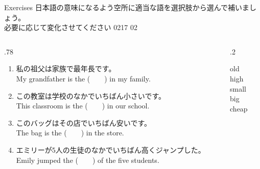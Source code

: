 \documentclass[aspectratio=169,xcolor={dvipsnames,table}]{beamer}
\begin{document}
\begin{frame}[plain]{Exercises}
日本語の意味になるよう空所に適当な語を選択肢から選んで補いましょう。\\必要に応じて変化させてください%
\hfill{\tiny 0217}\,{\scriptsize {}\,02}

\begin{columns}[t]
 \begin{column}{.78\textwidth}
   \begin{enumerate}
  \item 私の祖父は家族で最年長です。\\
	My grandfather is the (~~~~) in my family. 
    \item この教室は学校のなかでいちばん小さいです。\\
	This classroom is the (~~~~) in our school. 
    \item このバッグはその店でいちばん安いです。\\
	The bag is the (~~~~) in the store.
    \item エミリーが5人の生徒のなかでいちばん高くジャンプした。\\
	Emily jumped the (~~~~) of the five students.

\end{enumerate}

 \end{column}
\begin{column}{.2\textwidth}
 \begin{tcolorbox}
  old\\
  high\\
  small\\
  big\\
  cheap
 \end{tcolorbox}
\end{column}
\end{columns}
\end{frame}
\end{document}
